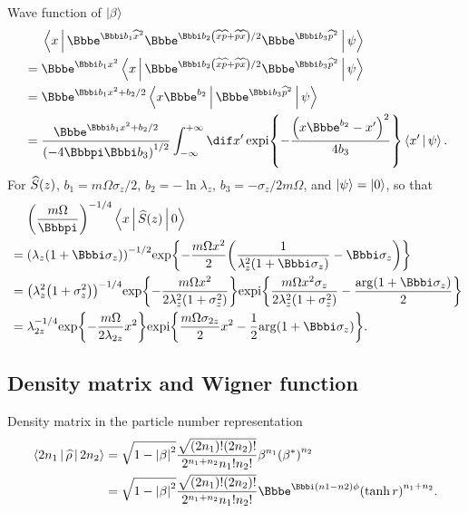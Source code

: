 \begin{nameddef}{Wave function of $\Ket{\beta}$}
\begin{align}
	&\phantom{{}={}} \Braket{x | \ee^{\ii b_1 \widehat{x}^2} \ee^{\ii b_2 
		\rbr{\widehat{x} \widehat{p} + \widehat{p} \widehat{x}}/2} \ee^{\ii b_3 
		\widehat{p}^2} | \psi} \nonumber \\
	&= \ee^{\ii b_1 x^2} \Braket{x | \ee^{\ii b_2 
		\rbr{\widehat{x} \widehat{p} + \widehat{p} \widehat{x}}/2} \ee^{\ii b_3 
		\widehat{p}^2} | \psi} \nonumber \\
	&= \ee^{\ii b_1 x^2 + b_2/2} \Braket{x \ee^{b_2} | \ee^{\ii b_3 
	\widehat{p}^2} | \psi} \nonumber \\
	&= \frac{\ee^{\ii b_1 x^2 + b_2/2}}{\rbr{-4\pp\ii b_3}^{1/2}}
		\int_{-\infty}^{+\infty}\dif x'\,\cfun{\expi}{-\frac{\rbr{x\ee^{b_2} 
		-x'}^2}{4b_3}}\Braket{x' | \psi}.
\end{align}
For ${\widehat{S}}\mathopen{}\left(z\right)\mathclose{}$, $b_1 = m\Omega\sigma_z/2$, $b_2 = -\ln \lambda_z$, 
$b_3 = -\sigma_z/2m\Omega$, and $\Ket{\psi} = \Ket{0}$, so that
	\begin{align}
	&\phantom{{}={}} \rbr{\frac{m\Omega}{\pp}}^{-1/4} \Braket{x | 
		\rfun{\widehat{S}}{z} | 0} \nonumber \\
	&= \rbr{\lambda_z\rbr{1+\ii\sigma_z}}^{-1/2}
	\cfun{\exp}{-\frac{m\Omega x^2}{2}
	\rbr{\frac{1}{\lambda_z^2\rbr{1+\ii\sigma_z}} - \ii\sigma_z}} \nonumber \\
	&= \rbr{\lambda_z^2\rbr{1+\sigma_z^2}}^{-1/4}
	\cfun{\exp}{-\frac{m\Omega x^2}{2 \lambda_z^2\rbr{1+\sigma_z^2}}}
	\cfun{\expi}{\frac{m\Omega x^2 \sigma_z}{2 \lambda_z^2\rbr{1+\sigma_z^2}}
		- \frac{\rfun{\arg}{1+\ii\sigma_z}}{2}} \nonumber \\
	&= \lambda_{2z}^{-1/4}
	\cfun{\exp}{-\frac{m\Omega}{2 \lambda_{2z}} x^2} 
	\cfun{\expi}{\frac{m\Omega\sigma_{2z}}{2} x^2 - \frac{1}{2}
	\rfun{\arg}{1+\ii\sigma_z}}.
	\end{align}
\end{nameddef} %

\subsection{Density matrix and Wigner function}

\begin{nameddef}{Density matrix in the particle number representation}
\begin{align}
\Braket{2n_1 | \widehat{\rho} | 2n_2} &= \sqrt{1-\vbr{\beta}^2}
\frac{\sqrt{\rbr{2n_1}!\rbr{2n_2}!}}{2^{n_1+n_2}n_1!n_2!}
\beta^{n_1} \rbr{\beta^*}^{n_2} \nonumber \\
&= \sqrt{1-\vbr{\beta}^2}
\frac{\sqrt{\rbr{2n_1}!\rbr{2n_2}!}}{2^{n_1+n_2}n_1!n_2!}
\ee^{\ii\rbr{n1-n2}\phi}\rbr{\tanh r}^{n_1+n_2}.
\end{align}
\end{nameddef} %

